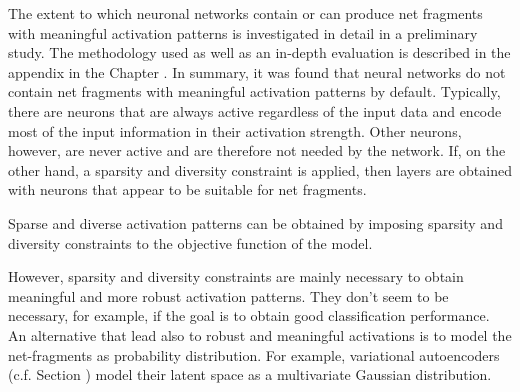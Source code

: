 The extent to which neuronal networks contain or can produce net fragments with meaningful activation patterns is investigated in detail in a preliminary study.
The methodology used as well as an in-depth evaluation is described in the appendix in the Chapter .
In summary, it was found that neural networks do not contain net fragments with meaningful activation patterns by default. Typically, there are neurons that are always active regardless of the input data and encode most of the input information in their activation strength.
Other neurons, however, are never active and are therefore not needed by the network.
If, on the other hand, a sparsity and diversity constraint is applied, then layers are obtained with neurons that appear to be suitable for net fragments.

\begin{implementation}
	Sparse and diverse activation patterns can be obtained by imposing sparsity and diversity constraints to the objective function of the model.
\end{implementation}

However, sparsity and diversity constraints are mainly necessary to obtain meaningful and more robust activation patterns.
They don't seem to be necessary, for example, if the goal is to obtain good classification performance.
An alternative that lead also to robust and meaningful activations is to model the net-fragments as probability distribution.
For example, variational autoencoders (c.f. Section ) model their latent space as a multivariate Gaussian distribution.


